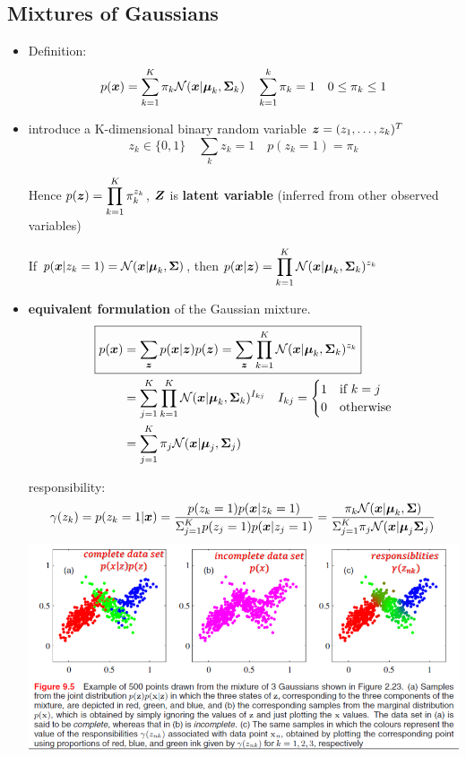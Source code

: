 \documentclass[11pt]{article}
\begin{document}
\subsection{Mixtures of Gaussians}
\label{sec:org21a8990}
\begin{itemize}
\item Definition: 
\begin{equation*}
p(\boldsymbol{x})=\displaystyle\sum_{k=1}^K\pi_k\mathcal{N}
(\boldsymbol{x}|\boldsymbol{\mu}_k,\boldsymbol{\Sigma}_k)\quad \displaystyle\sum_{k=1}^k\pi_k=1
\quad 0\le\pi_k\le1
\end{equation*}
\item introduce a K-dimensional binary random variable \(\boldsymbol{z}=(z_1,\dots,z_k)^T\)
\begin{equation*}
z_k\in\{0,1\}\quad \displaystyle\sum_kz_k=1\quad p(z_k=1)=\pi_k
\end{equation*}

Hence \(p(\boldsymbol{z})
     =\displaystyle\prod_{k=1}^K\pi_k^{z_k}\), \(\boldsymbol{Z}\) is \textbf{latent variable} (inferred
from other observed variables)

If \(p(\boldsymbol{x}|z_k=1)=\mathcal{N}(\boldsymbol{x}|\boldsymbol{\mu}_k,\boldsymbol{\Sigma})\), then
\(p(\boldsymbol{x}|\boldsymbol{z})=\displaystyle\prod_{k=1}^K\mathcal{N}(\boldsymbol{x}|\boldsymbol{\mu}_k,
     \boldsymbol{\Sigma}_k)^{z_k}\)
\item \textbf{equivalent formulation} of the Gaussian mixture.
\begin{align*}
\Aboxed{
p(\bl{x})&=\displaystyle\sum_{\bl{z}}p(\bl{x}|\bl{z})p(\bl{z})
=\displaystyle\sum_{\bl{z}}\displaystyle\prod_{k=1}^K
\mathcal{N}(\bl{x}|\bl{\mu}_k,\bl{\Sigma}_k)^{z_k}}\\
&=\displaystyle\sum_{j=1}^K\displaystyle\prod_{k=1}^K\mathcal{N}(\bl{x}|\bl{\mu}_k,
\bl{\Sigma}_k)^{I_{kj}}\quad I_{kj}=
\begin{cases}
1&\text{if } k=j\\
0&\text{otherwise}
\end{cases}\\
&=\displaystyle\sum_{j=1}^K\pi_j\mathcal{N}(\bl{x}|\bl{\mu}_j,\bl{\Sigma}_j)
\end{align*}

responsibility:
\begin{equation*}
\gamma(z_k)=p(z_k=1|\boldsymbol{x})=\frac{p(z_k=1)p(\boldsymbol{x}|z_k=1)}{\displaystyle\Sigma_{j=1}^Kp(z_j=1)p(\boldsymbol{x}|z_j=1)}
=\frac{ \pi_k\mathcal{N}(\boldsymbol{x}|\boldsymbol{\mu}_k,\boldsymbol{\Sigma})}{\displaystyle\Sigma_{j=1}^K\pi_j\mathcal{N}(\boldsymbol{x}|\boldsymbol{\mu}_j
\boldsymbol{\Sigma}_j)}
\end{equation*}
\includegraphics[width=130mm]{GMM}
\end{itemize}
\end{document}
